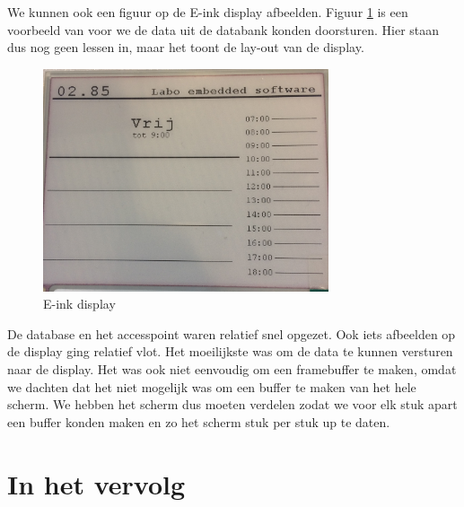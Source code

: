 \documentclass[a4paper,kul]{kulakarticle} %
\begin{document}
We kunnen ook een figuur op de E-ink display afbeelden. Figuur \ref{fig:vbscherm} is een voorbeeld van voor we de data uit de databank konden doorsturen. Hier staan dus nog geen lessen in, maar het toont de lay-out van de display.
\newline
\begin{figure}[h]
	\centering
	\includegraphics[width=0.75\textwidth]{vbScherm}
	\caption{E-ink display}
	\label{fig:vbscherm}
\end{figure}

De database en het accesspoint waren relatief snel opgezet. Ook iets afbeelden op de display ging relatief vlot. Het moeilijkste was om de data te kunnen versturen naar de display. Het was ook niet eenvoudig om een framebuffer te maken, omdat we dachten dat het niet mogelijk was om een buffer te maken van het hele scherm. We hebben het scherm dus moeten verdelen zodat we voor elk stuk apart een buffer konden maken en zo het scherm stuk per stuk up te daten.

\newpage

\section{In het vervolg}
\end{document}
